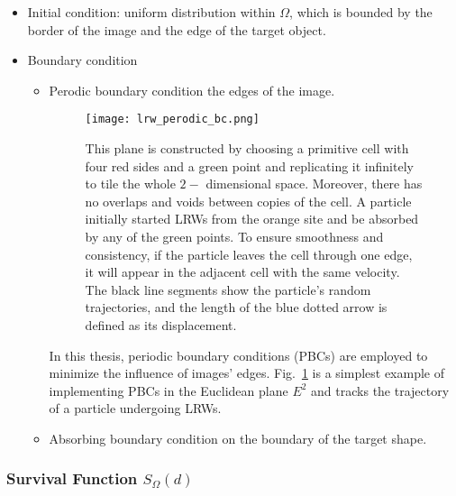        \begin{itemize}
           \item Initial condition: uniform distribution within $\Omega$, which is bounded by the border of the image and the edge of the target object.
           \item Boundary condition
             \begin{itemize}
               \item Perodic boundary condition the edges of the image.
               \par

               
                 \begin{figure}
                   \centering
                   \texttt{[image: lrw\_perodic\_bc.png]}
                   \caption{This plane is constructed by choosing a
                     primitive cell with four red sides and a green
                     point and replicating it infinitely to tile the
                     whole $2-$ dimensional space. Moreover, there has
                     no overlaps and voids between copies of the
                     cell. A particle initially started LRWs from the
                     orange site and be absorbed by any of the green
                     points.  To ensure smoothness and consistency, if
                     the particle leaves the cell through one edge, it
                     will appear in the adjacent cell with the same
                     velocity. The black line segments show the
                     particle's random trajectories, and the length of
                     the blue dotted arrow is defined as its
                     displacement.}
                   \label{fig:pbc_lrws}
                 \end{figure}

                 \par
                 
                 In this thesis, periodic boundary conditions (PBCs)
                 are employed to minimize the influence of images'
                 edges. Fig.~\ref{fig:pbc_lrws} is a simplest example
                 of implementing PBCs in the Euclidean plane $E^2$ and
                 tracks the trajectory of a particle undergoing LRWs.
               
               \item Absorbing boundary condition on the boundary of the target shape.
             \end{itemize}
       \end{itemize}
       

   \subsubsection{Survival Function $S_{\Omega}(d)$}

       
